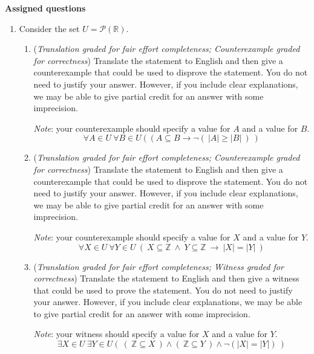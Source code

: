 \newpage
{\bf Assigned questions}

\begin{enumerate}
    \item Consider the set $U = \mathcal{P}(\mathbb{R})$. 
    
    \begin{enumerate}
        \item ({\it Translation graded for fair effort completeness; Counterexample graded 
        for correctness})  Translate the statement to English and then give a counterexample 
        that could be used to disprove the statement. You do not need to justify your answer.  
        However, if you include clear explanations, 
        we may be able to give partial credit for an answer with some imprecision.

        {\it Note}: your counterexample should specify a value for $A$ and a value for $B$.
        \[
            \forall A \in U ~\forall B \in U~(~( A \subseteq B \to \lnot (~|A| \geq |B|~)~)
        \]
        \item ({\it Translation graded for fair effort completeness; Counterexample graded 
        for correctness})  Translate the statement to English and then give a counterexample 
        that could be used to disprove the statement. You do not need to justify your answer.  
        However, if you include clear explanations, 
        we may be able to give partial credit for an answer with some imprecision.

        {\it Note}: your counterexample should specify a value for $X$ and a value for $Y$.
        \[
            \forall X \in U~\forall Y \in U~( ~X \subseteq \mathbb{Z}~\land~ Y \subseteq \mathbb{Z} ~\to~  |X|  = |Y| ~)
        \]
        \item ({\it Translation graded for fair effort completeness; Witness graded 
        for correctness})  Translate the statement to English and then give a witness 
        that could be used to prove the statement. You do not need to justify your answer.  
        However, if you include clear explanations, 
        we may be able to give partial credit for an answer with some imprecision.

        {\it Note}: your witness should specify a value for $X$ and a value for $Y$.
        \[
            \exists X \in U~ \exists Y \in U (~(~\mathbb{Z} \subseteq X~) \land
            (~\mathbb{Z} \subseteq Y~) \land \neg ( |X| = |Y|)~)
        \]
    \end{enumerate}


\end{enumerate}
